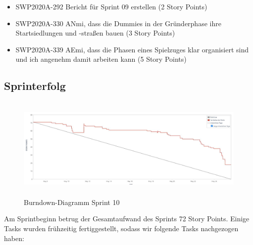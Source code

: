 \documentclass[12pt,a4paper, oneside]{article}
\begin{document}
\begin{itemize}
        \item SWP2020A-292 Bericht für Sprint 09 erstellen (2 Story Points)

        \item SWP2020A-330 ANmi, dass die Dummies in der Gründerphase ihre Startsiedlungen und -straßen bauen (3 Story Points)

        \item SWP2020A-339 AEmi, dass die Phasen eines Spielzuges klar organisiert sind und ich angenehm damit arbeiten kann (5 Story Points)


    \end{itemize}

    \newpage
    \subsection{Sprinterfolg}
    \begin{figure}[h]
        \centering
        \includegraphics[width=\textwidth, height=5cm]{../img/sprint_10/Burndown-Sprint10.png}
        \caption{Burndown-Diagramm Sprint 10}
        \label{fig: Burndown-Sprint 10}
    \end{figure}

    \noindent
    Am Sprintbeginn betrug der Gesamtaufwand des Sprints 72 Story Points. Einige Tasks wurden frühzeitig fertiggestellt, sodass wir folgende Tasks nachgezogen haben:
\end{document}
